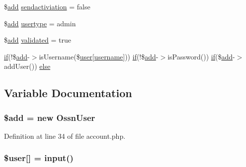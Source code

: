 \begin{DoxyCompactItemize}
\$\hyperlink{theme_8min_8js_a79ed6f45c867c160601f70dfa5ec2f95}{add} \hyperlink{actions_2account_8php_a11fe66faec6579a15979e62879ba8950}{sendactiviation} = false
\item 
\$\hyperlink{theme_8min_8js_a79ed6f45c867c160601f70dfa5ec2f95}{add} \hyperlink{actions_2account_8php_a13a7b92f40fdd23da18bc3eb7dcfd346}{usertype} = \textquotesingle{}admin\textquotesingle{}
\item 
\$\hyperlink{theme_8min_8js_a79ed6f45c867c160601f70dfa5ec2f95}{add} \hyperlink{actions_2account_8php_a2e76c73baded04b16081921afc8a709f}{validated} = true
\item 
\hyperlink{jquery_8tokeninput_8js_ad8dd46a3cbc004569e34401e9e71771a}{if}(!\$\hyperlink{theme_8min_8js_a79ed6f45c867c160601f70dfa5ec2f95}{add}-\/$>$is\+Username(\$\hyperlink{ossn_8config_8db_8example_8php_a802544b7ba9f79bbf24ef67773d53bed}{user}\mbox{[}\textquotesingle{}\hyperlink{actions_2account_8php_ac9b3768ccc688c2ff0811c50c107a02e}{username}\textquotesingle{}\mbox{]})) \hyperlink{jquery_8tokeninput_8js_ad8dd46a3cbc004569e34401e9e71771a}{if}(!\$\hyperlink{theme_8min_8js_a79ed6f45c867c160601f70dfa5ec2f95}{add}-\/$>$is\+Password()) \hyperlink{jquery_8tokeninput_8js_ad8dd46a3cbc004569e34401e9e71771a}{if}(\$\hyperlink{theme_8min_8js_a79ed6f45c867c160601f70dfa5ec2f95}{add}-\/$>$add\+User()) \hyperlink{actions_2account_8php_a49a98b4576a0eca7fdcd120dfc90f7a1}{else}
\end{DoxyCompactItemize}


\subsection{Variable Documentation}
\subsubsection[{\texorpdfstring{\$add}{$add}}]{\setlength{\rightskip}{0pt plus 5cm}\${\bf add} = new {\bf Ossn\+User}}\hypertarget{actions_2account_8php_a76aeb354fc71a358526ea9fbd7aae7a4}{}\label{actions_2account_8php_a76aeb354fc71a358526ea9fbd7aae7a4}


Definition at line 34 of file account.\+php.

\subsubsection[{\texorpdfstring{\$user}{$user}}]{\setlength{\rightskip}{0pt plus 5cm}\${\bf user}\mbox{[}\textquotesingle{}\mbox{]} = {\bf input}(\textquotesingle{})}\hypertarget{actions_2account_8php_a48c184d1487bdbc0b0d2fe6e1521dd7d}{}\label{actions_2account_8php_a48c184d1487bdbc0b0d2fe6e1521dd7d}


